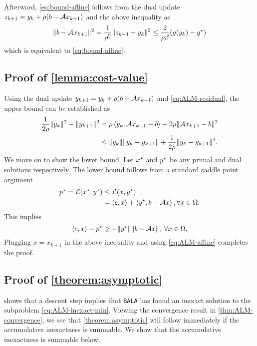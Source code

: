 \documentclass[11pt]{article}
\newcommand{\alg}{\texttt{BALA}}%
\begin{document}
  Afterward, \eqref{eq:bound-affine} follows from the dual update $z_{k+1} = y_k + \rho (b-\mathcal{A} x_{k+1})$ and the above inequality as
  \begin{align*}
      \|b-\mathcal{A} x_{k+1}\|^2 =\frac{1}{\rho^2} \|z_{k+1}-y_k\|^2 \leq \frac{2}{\rho \beta } (g(y_{k})-g^\star)
  \end{align*}
  which is equivalent to \eqref{eq:bound-affine}.
  
\subsection{Proof of \cref{lemma:cost-value}}
\label{apx:lemma:cost-value}
 Using the dual update $y_{k+1} = y_k + \rho (b-\mathcal{A} x_{k+1})$ and \cref{eq:ALM-residual}, the upper bound can be established as
        \begin{equation*}
        \begin{aligned}
            \frac{1}{2\rho}  \|y_k\|^2 -\|y_{k+1}\|^2   
            &=  \rho \left \langle y_k, \mathcal{A} x_{k+1} -b  \right\rangle + 2\rho \|\mathcal{A} x_{k+1} -b \|^2 \\
            &\leq    \|y_k\| \|y_k - y_{k+1}\| +   \frac{1}{2\rho}  \|y_k - y_{k+1}\|^2 .
        \end{aligned}
        \end{equation*}
        We move on to show the lower bound. Let $x^\star$ and $y^\star$ be any primal and dual solutions respectively. The lower bound follows from a standard saddle point argument 
        \begin{align*}
           p^\star  = \mathcal{L}(x^\star   ,y^\star) & \leq  \mathcal{L}(x,y^\star) \\
           & = \left \langle c, x \right\rangle + \left \langle y^\star, b - \mathcal{A} x \right\rangle,  \forall x \in \Omega.
        \end{align*}
        This implies 
        \begin{equation*}
            \left \langle c, x \right\rangle - p^\star \geq -\|y^\star\| \|b - \mathcal{A} x\|,\; \forall x \in \Omega.
        \end{equation*}
        Plugging $x = x_{k+1}$ in the above inequality and using \cref{eq:ALM-affine} completes the proof.

\subsection{Proof of \cref{theorem:asymptotic}}
\label{apx:theorem:asymptotic}
 shows that a descent step implies that \alg{} has found an inexact solution to the subproblem \eqref{eq:ALM-inexact-min}. Viewing the convergence result in \cref{thm:ALM-convergence}, we see that \cref{theorem:asymptotic} will follow immediately if the accumulative inexactness is summable. We show that the accumulative inexactness is summable below.
\end{document}
